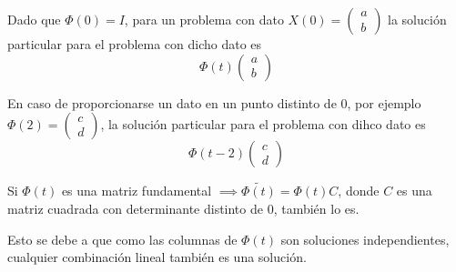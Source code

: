 \obs
Dado que $\Phi(0) = I$, para un problema con dato $X(0) = \begin{pmatrix}
a\\b
\end{pmatrix}$ la solución particular para el problema con dicho dato es $$\Phi(t)\begin{pmatrix}
a\\b
\end{pmatrix}$$

En caso de proporcionarse un dato en un punto distinto de $0$, por ejemplo $\Phi(2) = \begin{pmatrix}
c\\d
\end{pmatrix}$, la solución particular para el problema con dihco dato es
$$\Phi(t-2)\begin{pmatrix}
c\\d
\end{pmatrix}$$

\obs
Si $\Phi(t)$ es una matriz fundamental $\implies \tilde{\Phi(t)} = \Phi(t)C$, donde $C$ es una matriz cuadrada con determinante distinto de $0$, también lo es.

Esto se debe a que como las columnas de $\Phi(t)$ son soluciones independientes, cualquier combinación lineal también es una solución.

